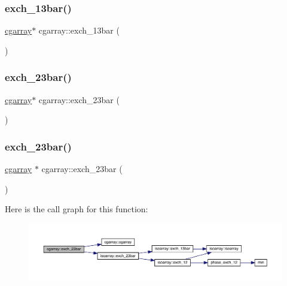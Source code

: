 \subsubsection{\texorpdfstring{exch\_13bar()}{exch\_13bar()}\hspace{0.1cm}{\footnotesize\ttfamily [2/2]}}
{\footnotesize\ttfamily \mbox{\hyperlink{classcgarray}{cgarray}}$\ast$ cgarray\+::exch\+\_\+13bar (\begin{DoxyParamCaption}{ }\end{DoxyParamCaption})}

\mbox{\label{classcgarray_a076528ed9996913e7017e81be6384a85}} 
\subsubsection{\texorpdfstring{exch\_23bar()}{exch\_23bar()}\hspace{0.1cm}{\footnotesize\ttfamily [1/2]}}
{\footnotesize\ttfamily \mbox{\hyperlink{classcgarray}{cgarray}}$\ast$ cgarray\+::exch\+\_\+23bar (\begin{DoxyParamCaption}{ }\end{DoxyParamCaption})}

\mbox{\label{classcgarray_af5c8cdf36d5e417b29162ca27805fc1b}} 
\subsubsection{\texorpdfstring{exch\_23bar()}{exch\_23bar()}\hspace{0.1cm}{\footnotesize\ttfamily [2/2]}}
{\footnotesize\ttfamily \mbox{\hyperlink{classcgarray}{cgarray}} $\ast$ cgarray\+::exch\+\_\+23bar (\begin{DoxyParamCaption}{ }\end{DoxyParamCaption})}

Here is the call graph for this function\+:\nopagebreak
\begin{figure}[H]
\begin{center}
\leavevmode
\includegraphics[width=350pt]{d7/d55/classcgarray_af5c8cdf36d5e417b29162ca27805fc1b_cgraph}
\end{center}
\end{figure}
\mbox{\label{classcgarray_ad55c1e537d3070a732d9355ed351d53e}} 
